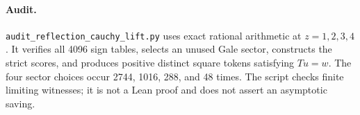 \documentclass[11pt]{article}
\begin{document}
\paragraph{Audit.}
\texttt{audit\_reflection\_cauchy\_lift.py} uses exact rational
arithmetic at $z=1,2,3,4$. It verifies all 4096 sign tables, selects
an unused Gale sector, constructs the strict scores, and produces
positive distinct square tokens satisfying $Tu=w$. The four sector
choices occur 2744, 1016, 288, and 48 times. The script checks finite
limiting witnesses; it is not a Lean proof and does not assert an
asymptotic saving.
\end{document}
